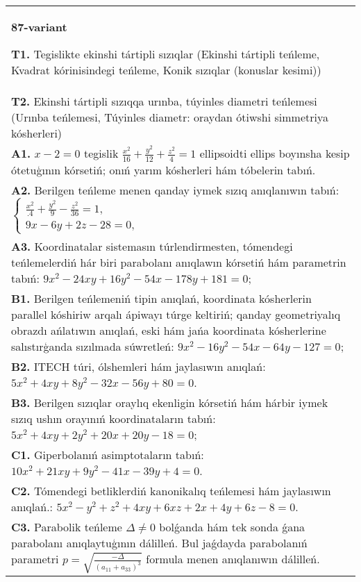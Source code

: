 \documentclass{article}
\begin{document}
\begin{tabular}{m{17cm}}
\textbf{87-variant}
\newline

\textbf{T1.} Tegislikte ekinshi tártipli sızıqlar (Ekinshi tártipli teńleme, Kvadrat kórinisindegi teńleme, Konik sızıqlar (konuslar kesimi)) \\
\textbf{T2.} Ekinshi tártipli sızıqqa urınba, túyinles diametri teńlemesi (Urınba teńlemesi, Túyinles diametr: oraydan ótiwshi simmetriya kósherleri) \\
\textbf{A1.} $x-2=0$ tegislik $\frac{x^2}{16}+\frac{y^2}{12}+\frac{z^2}{4}=1$ ellipsoidti ellips boyınsha kesip ótetuģının kórsetiń; onıń yarım kósherleri hám tóbelerin tabıń. \\
\textbf{A2.} Berilgen teńleme menen qanday iymek sızıq anıqlanıwın tabıń: $\left\{\begin{array}{l}\frac{x^2}{.4}+\frac{y^2}{9}-\frac{z^2}{36}=1, \\ 9 x-6 y+2 z-28=0,\end{array}\right.$ \\
\textbf{A3.} Koordinatalar sistemasın túrlendirmesten, tómendegi teńlemelerdiń hár biri parabolanı anıqlawın kórsetiń hám parametrin tabıń: $9 x^2-24 x y+16 y^2-54 x-178 y+181=0$; \\
\textbf{B1.} Berilgen teńlemeniń tipin anıqlań, koordinata kósherlerin parallel kóshiriw arqalı ápiwayı túrge keltiriń; qanday geometriyalıq obrazdı ańlatıwın anıqlań, eski hám jańa koordinata kósherlerine salıstırģanda sızılmada súwretleń: $9 x^2-16 y^2-54 x-64 y-127=0$; \\
\textbf{B2.} ITECH túri, ólshemleri hám jaylasıwın anıqlań: $5 x^2+4 x y+8 y^2-32 x-56 y+80=0$. \\
\textbf{B3.} Berilgen sızıqlar oraylıq ekenligin kórsetiń hám hárbir iymek sızıq ushın orayınıń koordinataların tabıń:$5 x^2+4 x y+2 y^2+20 x+20 y-18=0$; \\
\textbf{C1.} Giperbolanıń asimptotaların tabıń: $10 x^2+21 x y+9 y^2-41 x-39 y+4=0$. \\
\textbf{C2.} Tómendegi betliklerdiń kanonikalıq teńlemesi hám jaylasıwın anıqlań.: $5 x^2-y^2+z^2+4 x y+6 x z+2 x+4 y+6 z-8=0$. \\
\textbf{C3.} Parabolik teńleme $\Delta \neq 0$ bolǵanda hám tek sonda ǵana parabolanı anıqlaytuģının dálilleń. Bul jaǵdayda parabolanıń parametri $p=\sqrt{\frac{-\Delta}{ (a_{11}+a_{33}) ^3}}$ formula menen anıqlanıwın dálilleń. \\

\end{tabular}
\vspace{1cm}
\end{document}
